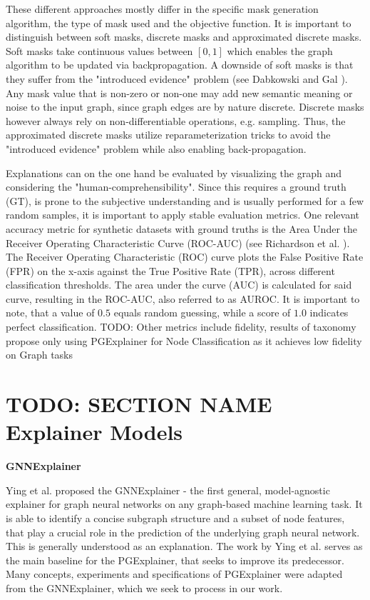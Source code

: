 These different approaches mostly differ in the specific mask generation algorithm, the type of mask used and the objective function. It is important to distinguish between soft masks, discrete masks and approximated discrete masks. Soft masks take continuous values between $[0,1]$ which enables the graph algorithm to be updated via backpropagation. A downside of soft masks is that they suffer from the "introduced evidence" problem (see Dabkowski and Gal \cite{dabkowski2017real}). Any mask value that is non-zero or non-one may add new semantic meaning or noise to the input graph, since graph edges are by nature discrete. Discrete masks however always rely on non-differentiable operations, e.g. sampling. Thus, the approximated discrete masks utilize reparameterization tricks to avoid the "introduced evidence" problem while also enabling back-propagation. %

Explanations can on the one hand be evaluated by visualizing the graph and considering the "human-comprehensibility". Since this requires a ground truth (GT), is prone to the subjective understanding and is usually performed for a few random samples, it is important to apply stable evaluation metrics. One relevant accuracy metric for synthetic datasets with ground truths is the Area Under the Receiver Operating Characteristic Curve (ROC-AUC) (see Richardson et al. \cite{RICHARDSON2024100994}). The Receiver Operating Characteristic (ROC) curve plots the False Positive Rate (FPR) on the x-axis against the True Positive Rate (TPR), across different classification thresholds. The area under the curve (AUC) is calculated for said curve, resulting in the ROC-AUC, also referred to as AUROC. It is important to note, that a value of $0.5$ equals random guessing, while a score of $1.0$ indicates perfect classification. TODO: Other metrics include fidelity, results of taxonomy propose only using PGExplainer for Node Classification as it achieves low fidelity on Graph tasks


\section{TODO: SECTION NAME Explainer Models}
\label{sec:Explainer_Models}

\textbf{GNNExplainer} \par
Ying et al. proposed the GNNExplainer \cite{ying2019gnnexplainer} - the first general, model-agnostic explainer for graph neural networks on any graph-based machine learning task. It is able to identify a concise subgraph structure and a subset of node features, that play a crucial role in the prediction of the underlying graph neural network. This is generally understood as an explanation. The work by Ying et al. serves as the main baseline for the PGExplainer, that seeks to improve its predecessor. Many concepts, experiments and specifications of PGExplainer were adapted from the GNNExplainer, which we seek to process in our work. \bigskip

